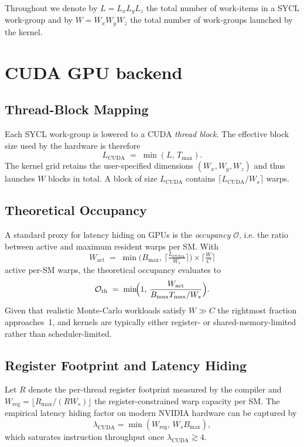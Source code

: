 Throughout we denote by $L=L_xL_yL_z$ the total number of work-items in a
SYCL work-group and by $W=W_xW_yW_z$ the total number of work-groups launched
by the kernel.

\section{CUDA GPU backend}
\label{subsec:cuda_backend}

\subsection{Thread-Block Mapping}
Each SYCL work-group is lowered to a CUDA \emph{thread block}.  The effective
block size used by the hardware is therefore
\[
  L_{\text{CUDA}}\;=\;\min(L,\,T_{\max}).
\]
The kernel grid retains the user-specified dimensions $(W_x,W_y,W_z)$ and thus
launches $W$ blocks in total.  A block of size $L_{\text{CUDA}}$ contains
$\lceil L_{\text{CUDA}}/W_s\rceil$ warps.

\subsection{Theoretical Occupancy}
A standard proxy for latency hiding on GPUs is the \emph{occupancy}
$\mathcal{O}$, i.e. the ratio between active and maximum resident warps per
SM.  With
\[
  W_{\text{act}} \;=\; \min\!\bigl(B_{\max},\,\bigl\lceil\tfrac{L_{\text{CUDA}}}{W_s}\bigr\rceil\bigr)\times
                     \bigl\lceil\tfrac{W}{C}\bigr\rceil
\]
active per-SM warps, the theoretical occupancy evaluates to
\[
  \mathcal{O}_{\text{th}} \;=\; \min\!\Bigl(1,\,\frac{W_{\text{act}}}{B_{\max}T_{\max}/W_s}\Bigr).
\]
Given that realistic Monte-Carlo workloads satisfy $W\gg C$ the rightmost
fraction approaches~1, and kernels are typically either register- or
shared-memory-limited rather than scheduler-limited.

\subsection{Register Footprint and Latency Hiding}
Let $R$ denote the per-thread register footprint measured by the compiler and
$W_{\text{reg}}=\lfloor R_{\max}/(RW_s)\rfloor$ the register-constrained warp
capacity per SM.  The empirical latency hiding factor on modern NVIDIA
hardware can be captured by
\[
  \lambda_{\text{CUDA}} = \min(W_{\text{reg}},\,W_s B_{\max}),
\]
which saturates instruction throughput once $\lambda_{\text{CUDA}}\gtrsim 4$.


